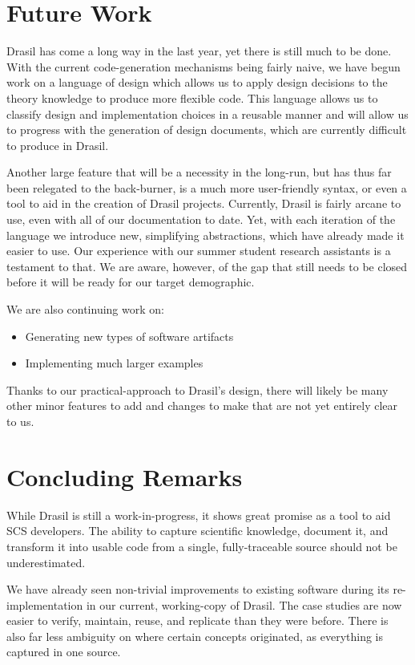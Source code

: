\documentclass[sigconf]{acmart}
\begin{document}
{\section{Future Work} \label{SecFuture}

Drasil has come a long way in the last year, yet there is still much to be 
done. With the current code-generation mechanisms being fairly naive, we have 
begun work on a language of design which allows us to apply design decisions to 
the theory knowledge to produce more flexible code. This language allows us to 
classify design and implementation choices in a reusable manner and will 
allow us to progress with the generation of design documents, which are 
currently difficult to produce in Drasil.

Another large feature that will be a necessity in the long-run, but has thus 
far been relegated to the back-burner, is a much more user-friendly syntax, or 
even a tool to aid in the creation of Drasil projects. Currently, Drasil is 
fairly arcane to use, even with all of our documentation to date. Yet, with 
each iteration of the language we introduce new, simplifying abstractions, 
which have already made it easier to use. Our experience with our summer student 
research assistants is a testament to that. We are aware, however, of the gap 
that still needs to be closed before it will be ready for our target 
demographic.

We are also continuing work on:
\begin{itemize}
	\item Generating new types of software artifacts
	\item Implementing much larger examples
\end{itemize}

Thanks to our practical-approach to Drasil's design, there will likely be many 
other minor features to add and changes to make that are not yet entirely clear 
to us.

\section{Concluding Remarks}

While Drasil is still a work-in-progress, it shows great promise as a tool to 
aid SCS developers. The ability to capture scientific knowledge, document it, 
and transform it into usable code from a single, fully-traceable source should 
not be underestimated.

We have already seen non-trivial improvements to existing software during its 
re-implementation in our current, working-copy of Drasil. The case studies are 
now easier to verify, maintain, reuse, and replicate than they were before. 
There is also far less ambiguity on where certain concepts originated, as 
everything is captured in one source.

}
\end{document}
